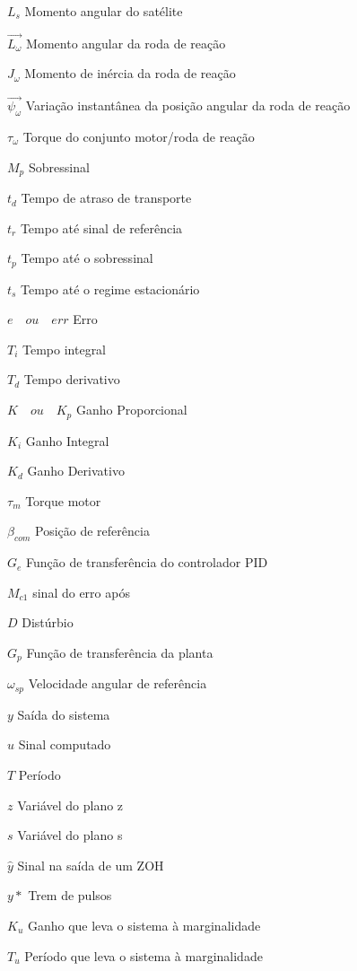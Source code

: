 \begin{simbolos}
  \item[$L_s$] Momento angular do satélite
  \item[$\vec{L_{\omega}}$] Momento angular da roda de reação
  \item[$J_{\omega}$] Momento de inércia da roda de reação
  \item[$\vec{\psi_{\omega}}$] Variação instantânea da posição angular da roda de reação
  \item[$\tau_{\omega}$] Torque do conjunto motor/roda de reação
  \item[$M_p$] Sobressinal
  \item[$t_d$] Tempo de atraso de transporte
  \item[$t_r$] Tempo até sinal de referência
  \item[$t_p$] Tempo até o sobressinal
  \item[$t_s$] Tempo até o regime estacionário
  \item[$e \quad ou  \quad err$] Erro
  \item[$T_i$] Tempo integral
  \item[$T_d$] Tempo derivativo
  \item[$K \quad ou  \quad K_p$] Ganho Proporcional
  \item[$K_i$] Ganho Integral
  \item[$K_d$] Ganho Derivativo
  \item[$\tau_m$] Torque motor
  \item[$\beta_{com}$] Posição de referência
  \item[$G_e$] Função de transferência do controlador PID
  \item[$M_{c1}$] sinal do erro após
  \item[$D$] Distúrbio
  \item[$G_p$] Função de transferência da planta
  \item[$\omega_{sp}$] Velocidade angular de referência
  \item[$y$] Saída do sistema
  \item[$u$] Sinal computado
  \item[$T$] Período
  \item[$z$] Variável do plano z
  \item[$s$] Variável do plano s
  \item[$\hat{y}$] Sinal na saída de um ZOH
  \item[$y*$] Trem de pulsos
  \item[$K_u$] Ganho que leva o sistema à marginalidade
  \item[$T_u$] Período que leva o sistema à marginalidade

\end{simbolos}
